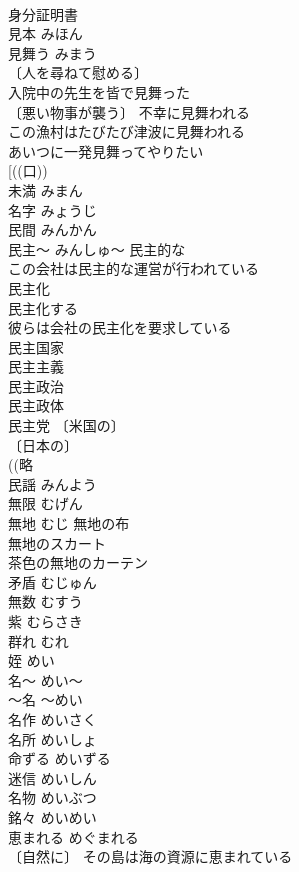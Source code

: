 \documentclass[8pt]{extreport}
\begin{document}
\begin{CJK}{UTF8}{min}
\\	身分証明書 
\\	見本	みほん	
\\	見舞う	みまう	
\\	〔人を尋ねて慰める〕
\\	入院中の先生を皆で見舞った 
\\	〔悪い物事が襲う〕 不幸に見舞われる 
\\	この漁村はたびたび津波に見舞われる 
\\	あいつに一発見舞ってやりたい 
\\	[((口)) 
\\	未満	みまん	
\\	名字	みょうじ	
\\	民間	みんかん	
\\	民主～	みんしゅ～	民主的な 
\\	この会社は民主的な運営が行われている 
\\	民主化 
\\	民主化する 
\\	彼らは会社の民主化を要求している 
\\	民主国家 
\\	民主主義 
\\	民主政治 
\\	民主政体 
\\	民主党 〔米国の〕
\\	〔日本の〕
\\	((略
\\	民謡	みんよう	
\\	無限	むげん	
\\	無地	むじ	無地の布 
\\	無地のスカート 
\\	茶色の無地のカーテン 
\\	矛盾	むじゅん	
\\	無数	むすう	
\\	紫	むらさき	
\\	群れ	むれ	
\\	姪	めい	
\\	名～	めい～	
\\	～名	～めい	
\\	名作	めいさく	
\\	名所	めいしょ	
\\	命ずる	めいずる	
\\	迷信	めいしん	
\\	名物	めいぶつ	
\\	銘々	めいめい	
\\	恵まれる	めぐまれる	
\\	〔自然に〕 その島は海の資源に恵まれている 

\end{CJK}
\end{document}
